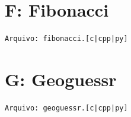 \documentclass[12pt,oneside]{article} %
\begin{document}
%


%

%

\newpage
\section*{F: Fibonacci} %
\vspace{-0.52cm}
\noindent \begin{verbatim}Arquivo: fibonacci.[c|cpp|py]\end{verbatim}


\newpage
\section*{G: Geoguessr} %
\vspace{-0.52cm}
\noindent \begin{verbatim}Arquivo: geoguessr.[c|cpp|py]\end{verbatim}


%
\end{document}
